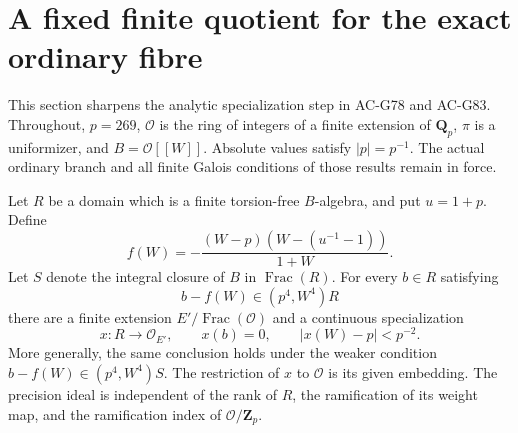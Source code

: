 \section{A fixed finite quotient for the exact ordinary fibre}
\label{sec:G84}

This section sharpens the analytic specialization step in AC-G78 and
AC-G83. Throughout, \(p=269\), \(\mathcal O\) is the ring of integers
of a finite extension of \(\mathbf Q_p\), \(\pi\) is a uniformizer,
and \(B=\mathcal O[[W]]\). Absolute values satisfy \(|p|=p^{-1}\).
The actual ordinary branch and all finite Galois conditions of those
results remain in force.

\begin{proposition}
\label{prop:G84-norm}
Let \(R\) be a domain which is a finite torsion-free \(B\)-algebra,
and put \(u=1+p\). Define
\[
 f(W)=-\frac{(W-p)(W-(u^{-1}-1))}{1+W}.
 \tag{G84.1}
\]
Let \(S\) denote the integral closure of \(B\) in
\(\operatorname{Frac}(R)\). For every \(b\in R\) satisfying
\[
 b-f(W)\in(p^4,W^4)R
 \tag{G84.2}
\]
there are a finite extension \(E'/\operatorname{Frac}(\mathcal O)\)
and a continuous specialization
\[
 x:R\longrightarrow\mathcal O_{E'},\qquad
 x(b)=0,\qquad |x(W)-p|<p^{-2}.
 \tag{G84.3}
\]
More generally, the same conclusion holds under the weaker condition
\(b-f(W)\in(p^4,W^4)S\). The restriction of \(x\) to
\(\mathcal O\) is its given embedding.
The precision ideal is independent of the rank of \(R\), the
ramification of its weight map, and the ramification index of
\(\mathcal O/\mathbf Z_p\).
\end{proposition}

